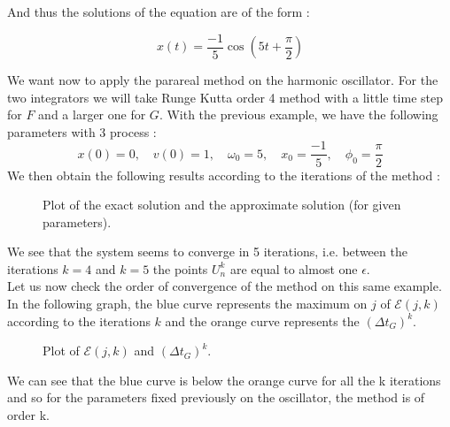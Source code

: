 \noindent And thus the solutions of the equation are of the form :

$$x(t) = \frac{-1}{5}\cos(5t+\frac{\pi}{2})$$

\noindent We want now to apply the parareal method on the harmonic oscillator. For the two integrators we will take Runge Kutta order 4 method with a little time step for $F$ and a larger one for $G$. With the previous example, we have the following parameters with 3 process :
$$x(0)=0,\quad v(0)=1, \quad\omega_0=5, \quad x_0=\frac{-1}{5}, \quad \phi_0=\frac{\pi}{2}$$
We then obtain the following results according to the iterations of the method :
\begin{figure}[H]
	\caption{Plot of the exact solution and the approximate solution (for given parameters).}
\end{figure}
\noindent We see that the system seems to converge in 5 iterations, i.e. between the iterations $k=4$ and $k=5$ the points $U_n^k$ are equal to almost one $\epsilon$. \\

\noindent Let us now check the order of convergence of the method on this same example. In the following graph, the blue curve represents the maximum on $j$ of $\mathcal{E}(j,k)$ according to the iterations $k$ and the orange curve represents the $(\Delta t_G)^k$.
\begin{figure}[H]
	\centering
	\caption{Plot of $\mathcal{E}(j,k)$ and $(\Delta t_G)^k$.}
\end{figure}
\noindent We can see that the blue curve is below the orange curve for all the k iterations and so for the parameters fixed previously on the oscillator, the method is of order k.

